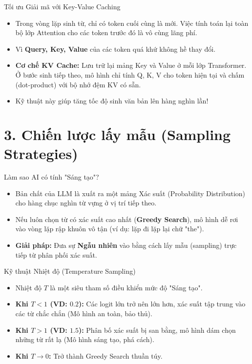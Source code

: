 \documentclass[aspectratio=169]{beamer}
\begin{document}
\begin{frame}{Tối ưu Giải mã với Key-Value Caching}
    \begin{itemize}
        \item Trong vòng lặp sinh từ, chỉ có token cuối cùng là mới. Việc tính toán lại toàn bộ lớp Attention cho các token trước đó là vô cùng lãng phí.
        \item Vì \textbf{Query, Key, Value} của các token quá khứ không hề thay đổi.
        \item \textbf{Cơ chế KV Cache:} Lưu trữ lại mảng Key và Value ở mỗi lớp Transformer. Ở bước sinh tiếp theo, mô hình chỉ tính Q, K, V cho token hiện tại và chấm (dot-product) với bộ nhớ đệm KV có sẵn.
        \item Kỹ thuật này giúp tăng tốc độ sinh văn bản lên hàng nghìn lần!
    \end{itemize}
\end{frame}

\section{3. Chiến lược lấy mẫu (Sampling Strategies)}

\begin{frame}{Làm sao AI có tính "Sáng tạo"?}
    \begin{itemize}
        \item Bản chất của LLM là xuất ra một mảng Xác suất (Probability Distribution) cho hàng chục nghìn từ vựng ở vị trí tiếp theo.
        \item Nếu luôn chọn từ có xác suất cao nhất (\textbf{Greedy Search}), mô hình dễ rơi vào vòng lặp rập khuôn vô tận (ví dụ: lặp đi lặp lại chữ "the").
        \item \textbf{Giải pháp:} Đưa sự \textbf{Ngẫu nhiên} vào bằng cách lấy mẫu (sampling) trực tiếp từ phân phối xác suất.
    \end{itemize}
\end{frame}

\begin{frame}{Kỹ thuật Nhiệt độ (Temperature Sampling)}
    \begin{itemize}
        \item Nhiệt độ $T$ là một siêu tham số điều khiển mức độ "Sáng tạo".
        \item \textbf{Khi $T < 1$ (VD: $0.2$):} Các logit lớn trở nên lớn hơn, xác suất tập trung vào các từ chắc chắn (Mô hình an toàn, bảo thủ).
        \item \textbf{Khi $T > 1$ (VD: $1.5$):} Phân bố xác suất bị san bằng, mô hình dám chọn những từ rất lạ (Mô hình sáng tạo, phá cách).
        \item \textbf{Khi $T \to 0$:} Trở thành Greedy Search thuần túy.
    \end{itemize}
\end{frame}
\end{document}
